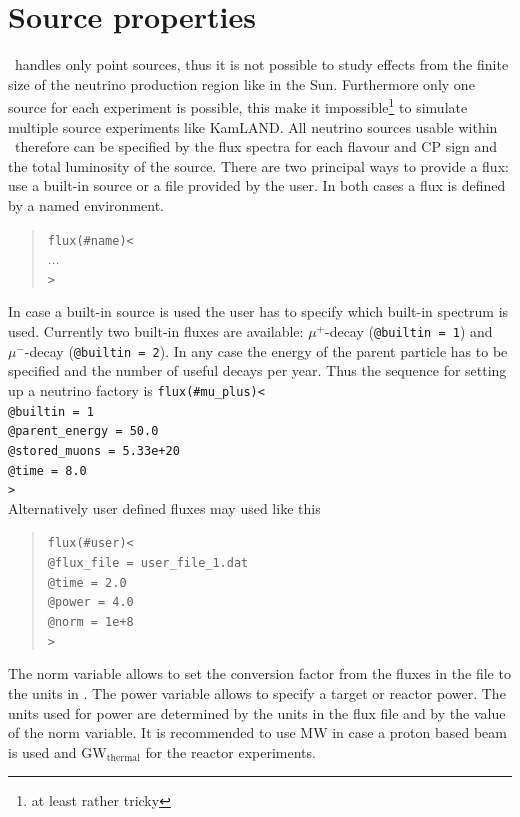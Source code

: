 \section{Source properties}
\label{sec:source}

\GLOBES\ handles only point sources, thus it is not possible
to study effects from the finite size of the neutrino production
region like in the Sun. Furthermore only one source for each experiment
is possible, this make it impossible\footnote{at least rather tricky} 
to simulate multiple source experiments like KamLAND. All neutrino
sources usable within \GLOBES\ therefore can be specified by the
flux spectra for each flavour and CP sign and the total luminosity
of the source. There are two principal ways to provide a flux:
use a built-in source or a file provided by the user. In both cases
a flux is defined by a named environment.
\begin{quote}
  {\tt flux(\#name)<\\
\tb $\ldots$\\
>}
\end{quote}


In case a built-in source is used the user has to specify which
built-in spectrum is used. Currently two built-in fluxes are available:
$\mu^+$-decay ({\tt @builtin = 1}) and $\mu^-$-decay ({\tt @builtin = 2}).
In any case  the energy of the parent particle has to be specified
and the number of useful decays per year. Thus the sequence for setting
up a neutrino factory is
{\tt flux(\#mu\_plus)<\\
\tb  @builtin = 1\\
\tb  @parent\_energy = 50.0\\
\tb  @stored\_muons = 5.33e+20\\
\tb  @time = 8.0\\
>}\\

Alternatively user defined fluxes may used like this
\begin{quote}
{\tt flux(\#user)<}\\
{\tt \tb @flux\_file = user\_file\_1.dat\\
\tb @time = 2.0\\
\tb @power = 4.0\\
\tb @norm = 1e+8}\\
{\tt >}
\end{quote}
 
The norm variable allows to set the conversion factor from the fluxes in
the file to the units in \GLOBES. The power variable allows to
specify a target or reactor power. The units used for power are determined
by the units in the flux file and by the value of the norm variable. It is
recommended to use $\mathrm{MW}$ in case a proton based beam is used and
$\mathrm{GW}_\mathrm{thermal}$ for the reactor experiments.



